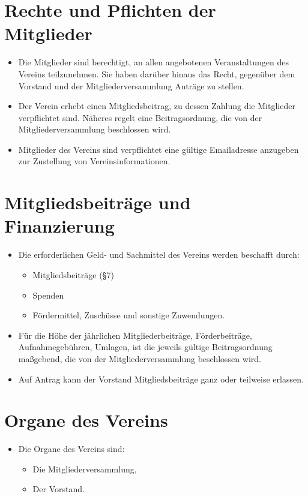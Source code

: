 \documentclass[a4paper,10pt]{article}
\begin{document}
\section{Rechte und Pflichten der Mitglieder}
  \begin{itemize}
   \item Die Mitglieder sind berechtigt, an allen angebotenen Veranstaltungen des Vereins teilzunehmen. Sie haben darüber hinaus das Recht, gegenüber dem Vorstand und der Mitgliederversammlung Anträge zu stellen. 
   \item Der Verein erhebt einen Mitgliedsbeitrag, zu dessen Zahlung die Mitglieder verpflichtet sind. Näheres regelt eine Beitragsordnung, die von der Mitgliederversammlung beschlossen wird.
   \item Mitglieder des Vereins sind verpflichtet eine gültige Emailadresse anzugeben zur Zustellung von Vereinsinformationen.
  \end{itemize}
  
\section{Mitgliedsbeiträge und Finanzierung}
  \begin{itemize}
   \item Die erforderlichen Geld- und Sachmittel des Vereins werden beschafft durch: 
   \begin{itemize}
    \item Mitgliedsbeiträge (§7) 
    \item Spenden
    \item Fördermittel, Zuschüsse und sonstige Zuwendungen. 
   \end{itemize}
   \item Für die Höhe der jährlichen Mitgliederbeiträge, Förderbeiträge, Aufnahmegebühren, Umlagen, ist die jeweils gültige Beitragsordnung maßgebend, die von der Mitgliederversammlung beschlossen wird.
   \item Auf Antrag kann der Vorstand Mitgliedsbeiträge ganz oder teilweise erlassen. 
  \end{itemize}


\section{Organe des Vereins}
  \begin{itemize}
   \item Die Organe des Vereins sind:
   \begin{itemize}
    \item Die Mitgliederversammlung,
    \item Der Vorstand.
   \end{itemize}
  \end{itemize}
\end{document}
